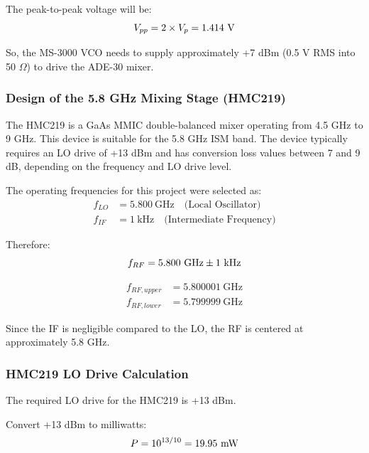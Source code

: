 \documentclass[12pt,a4paper]{report}
\begin{document}
	The peak-to-peak voltage will be:
	\begingroup
	\setlength{\mathindent}{0pt}
	\begin{equation*}
		\hfill
		V_{pp} = 2 \times V_p = 1.414\ \text{V}
		\hfill
	\end{equation*}
	\endgroup
	
	So, the MS-3000 VCO needs to supply approximately +7 dBm (0.5 V RMS into 50 $\Omega$) to drive the ADE-30 mixer.
	\subsubsection{Design of the 5.8 GHz Mixing Stage (HMC219)}
	The HMC219 is a GaAs MMIC double-balanced mixer operating from 4.5 GHz to 9 GHz. This device is suitable for the 5.8 GHz ISM band. The device typically requires an LO drive of +13 dBm and has conversion loss values between 7 and 9 dB, depending on the frequency and LO drive level.
	
	The operating frequencies for this project were selected as:
	\begin{align*}
		f_{LO} &= 5.800\ \text{GHz} \quad \text{(Local Oscillator)} \\
		f_{IF} &= 1\ \text{kHz} \quad \text{(Intermediate Frequency)}
	\end{align*}
	
	Therefore:
	\begingroup
	\setlength{\mathindent}{0pt}
	\begin{equation*}
		\hfill
		f_{RF} = 5.800\ \text{GHz} \pm 1\ \text{kHz}
		\hfill
	\end{equation*}
	\endgroup
	
	\begin{align*}
		f_{RF,upper} &= 5.800001\ \text{GHz} \\
		f_{RF,lower} &= 5.799999\ \text{GHz}
	\end{align*}
	
	Since the IF is negligible compared to the LO, the RF is centered at approximately 5.8 GHz.
	
	\subsubsection{HMC219 LO Drive Calculation}
	The required LO drive for the HMC219 is +13 dBm.
	
	Convert +13 dBm to milliwatts:
	\begingroup
	\setlength{\mathindent}{0pt}
	\begin{equation*}
		\hfill
		P = 10^{13/10} = 19.95\ \text{mW}
		\hfill
	\end{equation*}
	\endgroup
	
\end{document}
